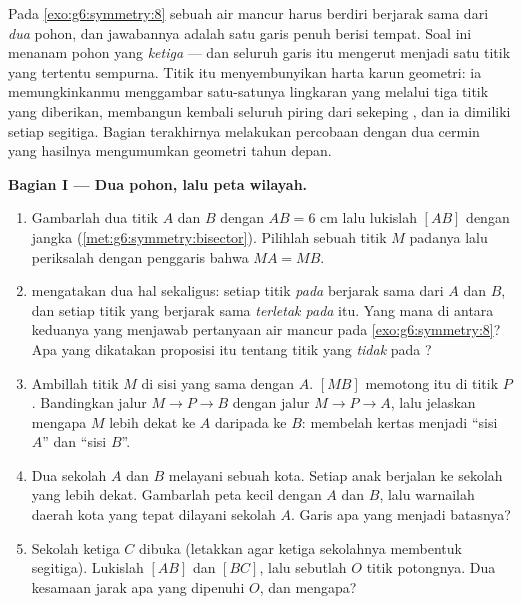 \begin{problem}
\label{pb:g6:symmetry:1}
Pada \cref{exo:g6:symmetry:8} sebuah air mancur harus berdiri
berjarak sama dari \emph{dua} pohon, dan jawabannya adalah satu
garis penuh berisi tempat. Soal ini menanam pohon yang \emph{ketiga}
--- dan seluruh garis itu mengerut menjadi satu titik yang tertentu
sempurna. Titik itu menyembunyikan harta karun geometri: ia
memungkinkanmu menggambar satu-satunya lingkaran yang melalui tiga
titik yang diberikan, membangun kembali seluruh piring dari sekeping
, dan ia dimiliki setiap segitiga. Bagian terakhirnya
melakukan percobaan dengan dua cermin yang hasilnya mengumumkan
geometri tahun depan.

\medskip
\noindent\textbf{Bagian I --- Dua pohon, lalu peta wilayah.}
\begin{enumerate}
  \item Gambarlah dua titik $A$ dan $B$ dengan $AB = 6$ cm lalu
        lukislah  $[AB]$ dengan jangka
        (\cref{met:g6:symmetry:bisector}). Pilihlah sebuah titik $M$
        padanya lalu periksalah dengan penggaris bahwa $MA = MB$.
  \item {} mengatakan dua hal
        sekaligus: setiap titik \emph{pada}  berjarak
        sama dari $A$ dan $B$, dan setiap titik yang berjarak sama
        \emph{terletak pada}  itu. Yang mana di antara
        keduanya yang menjawab pertanyaan air mancur pada
        \cref{exo:g6:symmetry:8}? Apa yang dikatakan proposisi itu
        tentang titik yang \emph{tidak} pada ?
  \item Ambillah titik $M$ di sisi  yang sama dengan $A$.
         $[MB]$ memotong  itu di titik $P$.
        Bandingkan jalur $M \to P \to B$ dengan jalur
        $M \to P \to A$, lalu jelaskan mengapa $M$ lebih dekat ke
        $A$ daripada ke $B$:  membelah kertas menjadi
        ``sisi $A$'' dan ``sisi $B$''.
  \item Dua sekolah $A$ dan $B$ melayani sebuah kota. Setiap anak
        berjalan ke sekolah yang lebih dekat. Gambarlah peta kecil
        dengan $A$ dan $B$, lalu warnailah daerah kota yang tepat
        dilayani sekolah $A$. Garis apa yang menjadi batasnya?
  \item Sekolah ketiga $C$ dibuka (letakkan agar ketiga sekolahnya
        membentuk segitiga). Lukislah  $[AB]$ dan  $[BC]$, lalu sebutlah $O$ titik potongnya. Dua kesamaan
        jarak apa yang dipenuhi $O$, dan mengapa?
\end{enumerate}


\end{problem}
